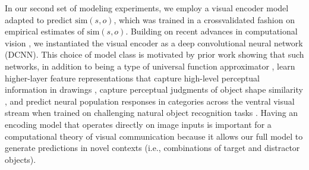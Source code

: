 \documentclass[9pt,twocolumn,twoside]{pnas-new}
\begin{document}
In our second set of modeling experiments, we employ a visual encoder model adapted to predict $\textrm{sim}(s,o)$, which was trained in a crossvalidated fashion on empirical estimates of $\textrm{sim}(s,o)$.
Building on recent advances in computational vision \cite{FanCommon2018,yamins2014performance}, we instantiated the visual encoder as a deep convolutional neural network (DCNN). 
This choice of model class is motivated by prior work showing that such networks, in addition to being a type of universal function approximator \cite{hornik1991approximation}, learn higher-layer feature representations that capture high-level perceptual information in drawings \cite{FanCommon2018}, capture perceptual judgments of object shape similarity \cite{kubilius2016deep}, and predict neural population responses in categories across the ventral visual stream \cite{yamins2014performance} when trained on challenging natural object recognition tasks \cite{deng2009imagenet}. 
Having an encoding model that operates directly on image inputs is important for a computational theory of visual communication because it allows our full model to generate predictions in novel contexts (i.e., combinations of target and distractor objects).
\end{document}
